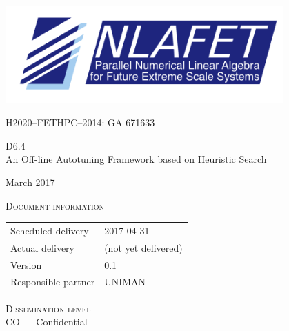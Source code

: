 \documentclass[a4paper,12pt]{article}
\def\nlafetMajor{6}
\def\nlafetMinor{4}
\def\nlafetTitle{An Off-line Autotuning Framework based on Heuristic Search}
\def\nlafetMonth{March}
\def\nlafetYear{2017}
\def\nlafetScheduledDelivery{2017-04-31}
\def\nlafetActualDelivery{(not yet delivered)}
\def\nlafetVersionMajor{0}
\def\nlafetVersionMinor{1}
\def\nlafetResponsiblePartner{UNIMAN}
\def\nlafetDisseminationLevel{CO --- Confidential}
\begin{document}
\begin{titlepage}
  \centering
  {
    \includegraphics[width=0.8\textwidth]{NLAFET-logo2}
  }
  \par
  \vspace{5mm}
  {
    H2020--FETHPC--2014: GA 671633
  }
  \par
  \vspace{4cm}
  {
    \Huge
    D\nlafetMajor.\nlafetMinor\\[1em]
    \nlafetTitle
  }
  \par
  \vfill
  {
    \Large
    \nlafetMonth{}
    \nlafetYear
  }
\end{titlepage}



%

\newpage

\noindent
\textsc{Document information}\\[1em]
\begin{tabular}{@{}ll}
  Scheduled delivery & \nlafetScheduledDelivery \\
  Actual delivery & \nlafetActualDelivery \\
  Version & \nlafetVersionMajor.\nlafetVersionMinor \\
  Responsible partner & \nlafetResponsiblePartner \\
\end{tabular}

\vspace{2em}

\noindent
\textsc{Dissemination level}\\[1em]
\nlafetDisseminationLevel
\end{document}
